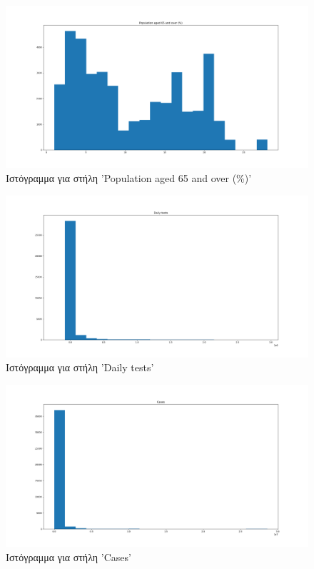 \documentclass[12pt,a4paper]{article}
\begin{document}
\begin{figure}[H]
	\includegraphics[width=\textwidth]{Figures/Question1/10. Histogram for population aged 65 and over.png}
	\caption{Ιστόγραμμα για στήλη 'Population aged 65 and over (\%)'}
\end{figure}

\begin{figure}[H]
	\includegraphics[width=\textwidth]{Figures/Question1/11. Histogram for daily tests.png}
	\caption{Ιστόγραμμα για στήλη 'Daily tests'}
\end{figure}

\begin{figure}[H]
	\includegraphics[width=\textwidth]{Figures/Question1/12. Histogram for cases.png}
	\caption{Ιστόγραμμα για στήλη 'Cases'}
\end{figure}
\end{document}

